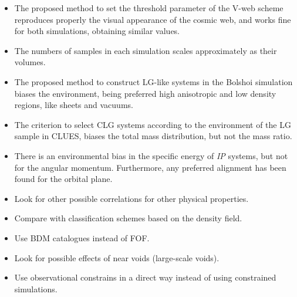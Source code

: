 \documentclass[8pt,fleqn]{beamer}
\begin{document}
\begin{frame}
\begin{tcolorbox}[colback=white!5,colframe=black!75!black,title=Conclusions]\justifying

	\begin{itemize}
	\color{black}	
	\item The proposed method to set the threshold parameter of the V-web 
	scheme reproduces properly the visual appearance of the cosmic web, and 
	works fine for both simulations, obtaining similar values.
	
	\item The numbers of samples in each simulation scales approximately as
	their volumes.	
	
	\item The proposed method to construct LG-like systems in the Bolshoi
	simulation biases the environment, being preferred high anisotropic and
	low density regions, like sheets and vacuums.
	
	\item The criterion to select CLG systems according to the environment of
	the LG sample in CLUES, biases the total mass distribution, but not the 
	mass ratio.
	
	\item There is an environmental bias in the specific energy of \textit{IP}
	systems, but not for the angular momentum. Furthermore, any preferred
	alignment has been found for the orbital plane.
	
	\end{itemize}

\end{tcolorbox}
\end{frame}
\begin{frame}
\begin{tcolorbox}[colback=white!5,colframe=black!75!black,title=Further Work]\justifying

	\begin{itemize}
	\color{black}	
	\item Look for other possible correlations for other physical properties.
	\item Compare with classification schemes based on the density field.
	\item Use BDM catalogues instead of FOF.
	\item Look for possible effects of near voids (large-scale voids).
	\item Use observational constrains in a direct way instead of using 
	constrained simulations.
	\end{itemize}

\end{tcolorbox}
\end{frame}
\end{document}

